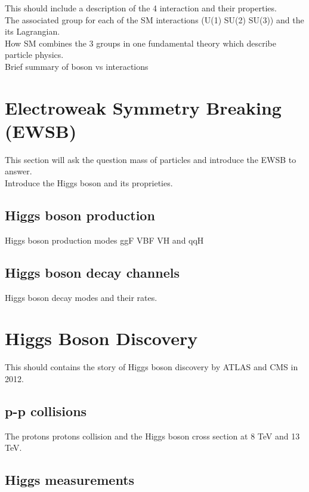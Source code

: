 This should include a description of the 4 interaction and their properties.\\
The associated group for each of the SM interactions (U(1) SU(2) SU(3)) and the its Lagrangian.\\
How SM combines the 3 groups in one fundamental theory which describe particle physics.\\
Brief summary of boson vs interactions

\section{Electroweak Symmetry Breaking (EWSB)}
\label{chap1:EWSB}

This section will ask the question mass of particles and introduce the EWSB to answer.\\
Introduce the Higgs boson and its proprieties.\\

\subsection{Higgs boson production}
\label{chap1:EWSB:HP}

Higgs boson production modes ggF VBF VH and qqH

\subsection{Higgs boson decay channels}
\label{chap1:EWSB:HD}

Higgs boson decay modes and their rates.

\section{Higgs Boson Discovery}
\label{chap1:H2012}

This should contains the story of Higgs boson discovery by ATLAS and CMS in 2012.

\subsection{p-p collisions}
\label{chap1:H2012:PP}

The protons protons collision and the Higgs boson cross section at 8 TeV and 13 TeV.

\subsection{Higgs measurements}
\label{chap1:H2012:HM}

